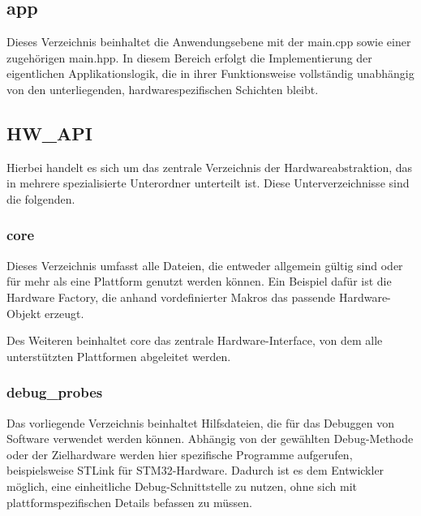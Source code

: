 \subsection*{app}
Dieses Verzeichnis beinhaltet die Anwendungsebene mit der main.cpp sowie einer zugehörigen main.hpp. 
In diesem Bereich erfolgt die Implementierung der eigentlichen Applikationslogik, die in ihrer Funktionsweise vollständig unabhängig von den unterliegenden, hardwarespezifischen Schichten bleibt.

\subsection*{HW\_API}
Hierbei handelt es sich um das zentrale Verzeichnis der Hardwareabstraktion, das in mehrere spezialisierte Unterordner unterteilt ist.
Diese Unterverzeichnisse sind die folgenden.

\subsubsection*{core}
Dieses Verzeichnis umfasst alle Dateien, die entweder allgemein gültig sind oder für mehr als eine Plattform genutzt werden können. 
Ein Beispiel dafür ist die Hardware Factory, die anhand vordefinierter Makros das passende Hardware-Objekt erzeugt.

Des Weiteren beinhaltet core das zentrale Hardware-Interface, von dem alle unterstützten Plattformen abgeleitet werden.

\subsubsection*{debug\_probes}
Das vorliegende Verzeichnis beinhaltet Hilfsdateien, die für das Debuggen von Software verwendet werden können.
Abhängig von der gewählten Debug-Methode oder der Zielhardware werden hier spezifische Programme aufgerufen, beispielsweise STLink für STM32-Hardware.
Dadurch ist es dem Entwickler möglich, eine einheitliche Debug-Schnittstelle zu nutzen, ohne sich mit plattformspezifischen Details befassen zu müssen.

